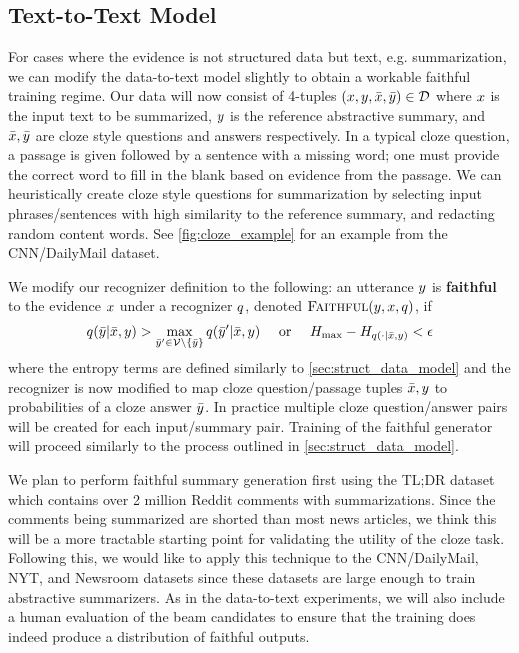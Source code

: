 
\subsection{Text-to-Text Model}
For cases where the evidence is not structured data but text, e.g. 
summarization, we can modify the data-to-text model slightly to obtain 
a workable faithful training regime. Our data will now consist of 
4-tuples $(x, y, \bar{x}, \bar{y}) \in 
\mathcal{D}$ where $x$ is the input text to be summarized, 
$y$ is the reference
abstractive summary, and $\bar{x}, \bar{y}$ are cloze
style questions and answers \citep{taylor1953cloze} respectively. In
a typical cloze question, a passage is given followed by a sentence with a 
missing word; one must provide the correct word to fill in the blank 
based
on evidence from the passage. We can heuristically create cloze style questions
for summarization by selecting input phrases/sentences with high similarity
to the reference summary, and redacting random content words. See 
\autoref{fig:cloze_example} for an example from the CNN/DailyMail dataset.



We modify our recognizer definition to the following:
an utterance $y$ is \textbf{faithful}
 to the evidence $x$ under a recognizer $q$, 
denoted $\textsc{Faithful}(y,x,q)$, if
\[ q(\bar{y} |\bar{x}, y) >
 \max_{\bar{y}^\prime \in \mathcal{V} \setminus \{\bar{y}\}}
q(\bar{y}^\prime |\bar{x}, y)
  \quad \textrm{ or } \quad  
  H_{\max} - H_{q(\cdot|\bar{x}, y)} < \epsilon\]
where the entropy terms are defined similarly to 
\autoref{sec:struct_data_model} and the recognizer is now modified to map 
cloze question/passage tuples $\bar{x},y$ to probabilities
of a cloze answer
$\bar{y}$. In practice multiple cloze question/answer pairs will
be created for each input/summary pair. Training of the faithful generator
will proceed similarly to the process outlined in \autoref{sec:struct_data_model}.

We plan to perform faithful summary generation
first using the TL;DR dataset \citep{volske2017tl} which contains over 2 
million
Reddit comments with summarizations. Since the comments being summarized
are shorted than most news articles, we think this will be a more tractable
starting point for validating the utility of the cloze task.
Following this, we would like to apply this technique to
the CNN/DailyMail, NYT, and Newsroom datasets 
\citep{hermann2015teaching,sandhaus2008new,grusky2018newsroom} since
these datasets are large enough to train abstractive summarizers.
As in the data-to-text experiments, we will also include a human evaluation
of the beam candidates to ensure that the training does indeed produce
a distribution of faithful outputs.
